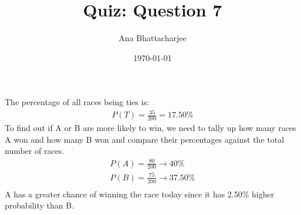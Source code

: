 \documentclass{article}
\begin{document}
\title{Quiz: Question 7}
\author{Ana Bhattacharjee}
\date{\today}
\maketitle

\begin{center}
  The percentage of all races being ties is:
  \begin{align}
    P(T) = \frac{35}{200} = 17.50\%
  \end{align}
To find out if A or B are more likely to win, we need to tally up how many races A won and how many B won and compare their percentages against the total number of races.
\begin{align}
  P(A) = \frac{80}{200} \rightarrow 40\% \\
  P(B) = \frac{75}{200} \rightarrow 37.50\% \\
\end{align}
A has a greater chance of winning the race today since it has 2.50\% higher probability than B. 
\end{center}
\end{document}

